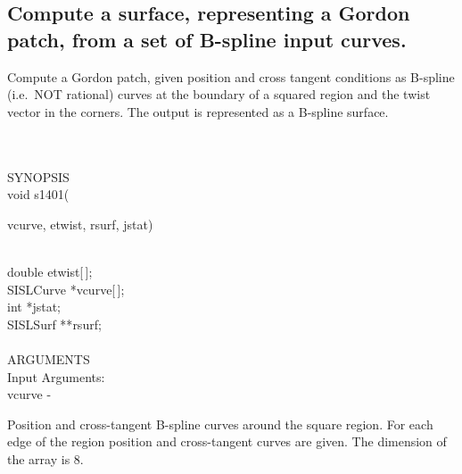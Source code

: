 \subsection{Compute a surface, representing a Gordon patch, from a set
of B-spline input curves.}
\begin{minipg1}
  Compute a Gordon patch, given position and cross tangent conditions as
  B-spline (i.e.\ NOT rational) curves at the boundary of a squared
  region and the twist vector in the corners.
  The output is represented as a B-spline surface.
\end{minipg1} \\ \\
SYNOPSIS\\
        \>void s1401(\begin{minipg3}
          {\fov vcurve}, {\fov etwist}, {\fov rsurf}, {\fov jstat})
        \end{minipg3}\\[0.3ex]
        \>\>    double    \> {\fov etwist}[\,];\\
        \>\>    SISLCurve \> *{\fov vcurve}[\,];\\
        \>\>    int       \> *{\fov jstat};\\
        \>\>    SISLSurf  \> **{\fov rsurf};\\
\\
ARGUMENTS\\
        \>Input Arguments:\\
        \>\>    {\fov vcurve} \> - \>
        \begin{minipg2}
          Position and cross-tangent B-spline curves around the square
          region. For each edge of the region position and cross-tangent
          curves are given. The dimension of the array is 8.
        \end{minipg2}\\[0.8ex]
